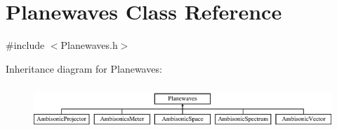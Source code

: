 \hypertarget{class_planewaves}{\section{Planewaves Class Reference}
\label{class_planewaves}
}


{\ttfamily \#include $<$Planewaves.\-h$>$}

Inheritance diagram for Planewaves\-:\begin{figure}[H]
\begin{center}
\leavevmode
\includegraphics[height=1.709924cm]{class_planewaves}
\end{center}
\end{figure}
